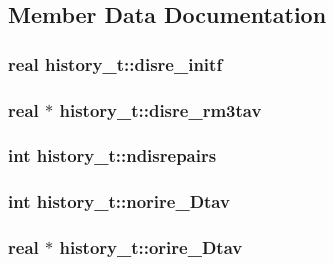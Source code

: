 \subsection{\-Member \-Data \-Documentation}
\hypertarget{structhistory__t_a9a140a386e26d62b1d6fb96127791140}{
\subsubsection[{disre\-\_\-initf}]{\setlength{\rightskip}{0pt plus 5cm}real {\bf history\-\_\-t\-::disre\-\_\-initf}}}\label{structhistory__t_a9a140a386e26d62b1d6fb96127791140}
\hypertarget{structhistory__t_acf32d76997e1ed9577acbbb4badb05f9}{
\subsubsection[{disre\-\_\-rm3tav}]{\setlength{\rightskip}{0pt plus 5cm}real $\ast$ {\bf history\-\_\-t\-::disre\-\_\-rm3tav}}}\label{structhistory__t_acf32d76997e1ed9577acbbb4badb05f9}
\hypertarget{structhistory__t_ade4cea80c99fef9a3181bc0958c9abbb}{
\subsubsection[{ndisrepairs}]{\setlength{\rightskip}{0pt plus 5cm}int {\bf history\-\_\-t\-::ndisrepairs}}}\label{structhistory__t_ade4cea80c99fef9a3181bc0958c9abbb}
\hypertarget{structhistory__t_a5fcbe47e5c94a73fae166b5961a9b1c5}{
\subsubsection[{norire\-\_\-\-Dtav}]{\setlength{\rightskip}{0pt plus 5cm}int {\bf history\-\_\-t\-::norire\-\_\-\-Dtav}}}\label{structhistory__t_a5fcbe47e5c94a73fae166b5961a9b1c5}
\hypertarget{structhistory__t_a587f9595a1e82da9ebc3be38316ef317}{
\subsubsection[{orire\-\_\-\-Dtav}]{\setlength{\rightskip}{0pt plus 5cm}real $\ast$ {\bf history\-\_\-t\-::orire\-\_\-\-Dtav}}}\label{structhistory__t_a587f9595a1e82da9ebc3be38316ef317}
